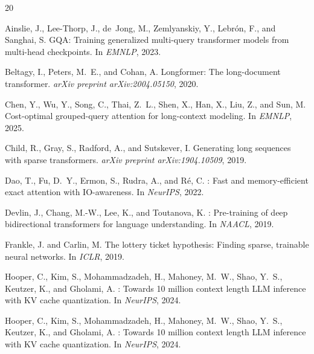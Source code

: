 \documentclass{article} %
\begin{document}
\begin{thebibliography}{20}

Ainslie, J., Lee-Thorp, J., de~Jong, M., Zemlyanskiy, Y., Lebr{\'o}n, F., and Sanghai, S.
\newblock GQA: Training generalized multi-query transformer models from multi-head checkpoints.
\newblock In \emph{EMNLP}, 2023.

Beltagy, I., Peters, M.~E., and Cohan, A.
\newblock Longformer: The long-document transformer.
\newblock \emph{arXiv preprint arXiv:2004.05150}, 2020.

Chen, Y., Wu, Y., Song, C., Thai, Z.~L., Shen, X., Han, X., Liu, Z., and Sun, M.
\newblock Cost-optimal grouped-query attention for long-context modeling.
\newblock In \emph{EMNLP}, 2025.

Child, R., Gray, S., Radford, A., and Sutskever, I.
\newblock Generating long sequences with sparse transformers.
\newblock \emph{arXiv preprint arXiv:1904.10509}, 2019.

Dao, T., Fu, D.~Y., Ermon, S., Rudra, A., and R{\'e}, C.
: Fast and memory-efficient exact attention with {IO}-awareness.
\newblock In \emph{NeurIPS}, 2022.

Devlin, J., Chang, M.-W., Lee, K., and Toutanova, K.
: Pre-training of deep bidirectional transformers for language understanding.
\newblock In \emph{NAACL}, 2019.

Frankle, J. and Carlin, M.
\newblock The lottery ticket hypothesis: Finding sparse, trainable neural networks.
\newblock In \emph{ICLR}, 2019.

Hooper, C., Kim, S., Mohammadzadeh, H., Mahoney, M.~W., Shao, Y.~S., Keutzer, K., and Gholami, A.
: Towards 10 million context length {LLM} inference with {KV} cache quantization.
\newblock In \emph{NeurIPS}, 2024.

Hooper, C., Kim, S., Mohammadzadeh, H., Mahoney, M.~W., Shao, Y.~S., Keutzer, K., and Gholami, A.
: Towards 10 million context length {LLM} inference with {KV} cache quantization.
\newblock In \emph{NeurIPS}, 2024.


\end{thebibliography}
\end{document}
